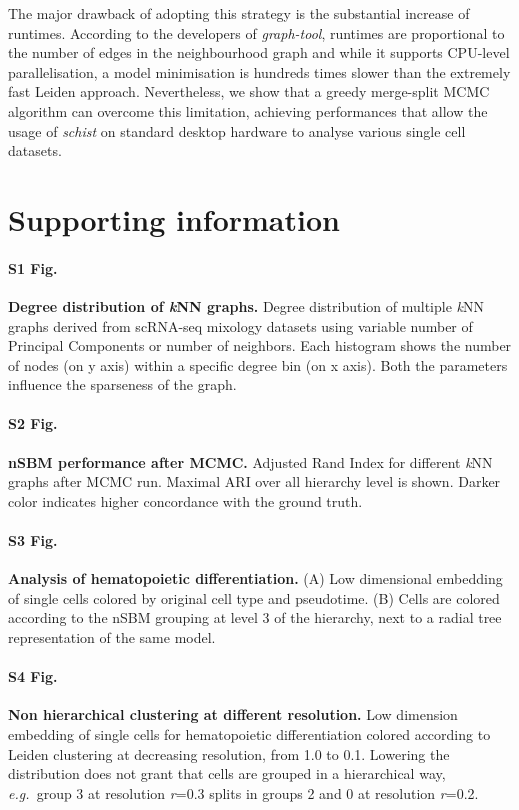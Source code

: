 \documentclass[10pt,letterpaper]{article}
\begin{document}
The major drawback of adopting this strategy is the substantial increase of runtimes. According to the developers of \emph{graph-tool}, runtimes are proportional to the number of edges in the neighbourhood graph and while it supports CPU-level parallelisation, a model minimisation is hundreds times slower than the extremely fast Leiden approach. Nevertheless, we show that a greedy merge-split MCMC algorithm can overcome this limitation, achieving performances that allow the usage of \emph{schist} on standard desktop hardware to analyse various single cell datasets.


\section*{Supporting information}

\paragraph*{S1 Fig.}
\label{S1_Fig}
{\bf Degree distribution of \emph{k}NN graphs.} Degree distribution of multiple \emph{k}NN graphs derived from scRNA-seq mixology datasets using variable number of Principal Components or number of neighbors. Each histogram shows the number of nodes (on y axis) within a specific degree bin (on x axis). Both the parameters influence the sparseness of the graph.

\paragraph*{S2 Fig.}
\label{S2_Fig}
{\bf nSBM performance after MCMC.}  Adjusted Rand Index for different \emph{k}NN graphs after MCMC run. Maximal ARI over all hierarchy level is shown. Darker color indicates higher concordance with the ground truth.

\paragraph*{S3 Fig.}
\label{S3_Fig}
{\bf Analysis of hematopoietic differentiation. }  (A) Low dimensional embedding of single cells colored by original cell type and pseudotime. (B) Cells are colored according to the nSBM grouping at level 3 of the hierarchy, next to a radial tree representation of the same model.

\paragraph*{S4 Fig.}
\label{S4_Fig}
{\bf Non hierarchical clustering at different resolution.}  Low dimension embedding of single cells for hematopoietic differentiation colored according to Leiden clustering at decreasing resolution, from 1.0 to 0.1. Lowering the distribution does not grant that cells are grouped in a hierarchical way, \emph{e.g.\ }group 3 at resolution \emph{r}=0.3 splits in groups 2 and 0 at resolution \emph{r}=0.2.
\end{document}
